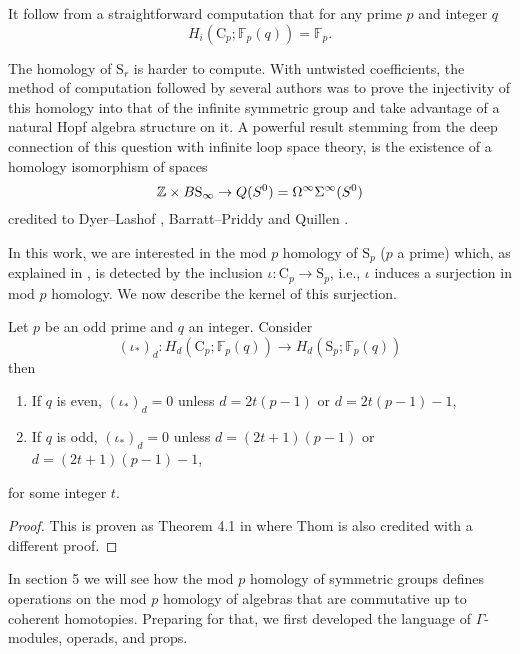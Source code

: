 It follow from a straightforward computation that for any prime $p$ and integer $q$
\begin{equation*}
H_i(\mathrm{C}_p; \mathbb{F}_p(q)) = \mathbb{F}_p.
\end{equation*}

The homology of $\mathrm{S}_r$ is harder to compute.
With untwisted coefficients, the method of computation followed by several authors was to prove the injectivity of this homology into that of the infinite symmetric group and take advantage of a natural Hopf algebra structure on it.
A powerful result stemming from the deep connection of this question with infinite loop space theory, is the existence of a homology isomorphism of spaces
\begin{equation*}
\mathbb{Z} \times B\mathrm{S}_\infty \to Q(S^0) = \Omega^\infty \Sigma^\infty (S^0)
\end{equation*}
credited to Dyer--Lashof \cite{dyer62lashof}, Barratt--Priddy and Quillen \cite{barratt1972priddyquillen}.

In this work, we are interested in the mod $p$ homology of $\mathrm{S}_p$ ($p$ a prime) which, as explained in \cite[Corollary~VI.1.4]{adem2004milgram}, is detected by the inclusion $\iota \colon \mathrm{C}_p \to \mathrm{S}_p$, i.e., $\iota$ induces a surjection in mod $p$ homology.
We now describe the kernel of this surjection.

\begin{lemma} \label{lem: Thom's theorem}
	Let $p$ be an odd prime and $q$ an integer.
	Consider
	\begin{equation*}
	(\iota_\ast)_d \colon H_d(\mathrm{C}_p; \mathbb{F}_p(q)) \to H_d(\mathrm{S}_p; \mathbb{F}_p(q))
	\end{equation*}
	then
	\begin{enumerate}
		\item If $q$ is even, $(\iota_\ast)_d = 0$ unless $d = 2t(p-1)$ or $d = 2t(p-1) - 1$,
		\item If $q$ is odd, $(\iota_\ast)_d = 0$ unless $d = (2t+1)(p-1)$ or $d = (2t+1)(p-1)-1$,
	\end{enumerate}
	for some integer $t$.
\end{lemma}

\begin{proof}
	This is proven as Theorem 4.1 in \cite{steenrod1953cyclic} where Thom is also credited with a different proof.
\end{proof}

In section 5 we will see how the mod $p$ homology of symmetric groups defines operations on the mod $p$ homology of algebras that are commutative up to coherent homotopies.
Preparing for that, we first developed the language of $\Gamma$-modules, operads, and props.